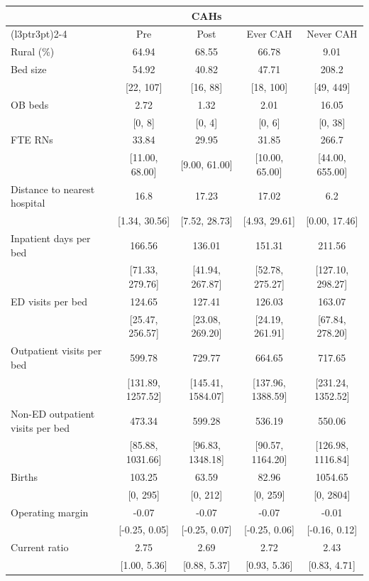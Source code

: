 \begin{tabular}[t]{lcccc}
\toprule
\multicolumn{1}{c}{ } & \multicolumn{3}{c}{CAHs} & \multicolumn{1}{c}{ } \\
\cmidrule(l{3pt}r{3pt}){2-4}
 & Pre & Post & Ever CAH & Never CAH\\
\midrule
Rural (\%) & 64.94 & 68.55 & 66.78 & 9.01 \\
Bed size & 54.92 & 40.82 & 47.71 & 208.2 \\
 & {}[22, 107] & {}[16, 88] & {}[18, 100] & {}[49, 449] \\
OB beds & 2.72 & 1.32 & 2.01 & 16.05 \\
 & {}[0, 8] & {}[0, 4] & {}[0, 6] & {}[0, 38] \\
FTE RNs & 33.84 & 29.95 & 31.85 & 266.7 \\
 & {}[11.00, 68.00] & {}[9.00, 61.00] & {}[10.00, 65.00] & {}[44.00, 655.00] \\
Distance to nearest hospital & 16.8 & 17.23 & 17.02 & 6.2 \\
 & {}[1.34, 30.56] & {}[7.52, 28.73] & {}[4.93, 29.61] & {}[0.00, 17.46] \\
Inpatient days per bed & 166.56 & 136.01 & 151.31 & 211.56 \\
 & {}[71.33, 279.76] & {}[41.94, 267.87] & {}[52.78, 275.27] & {}[127.10, 298.27] \\
ED visits per bed & 124.65 & 127.41 & 126.03 & 163.07 \\
 & {}[25.47, 256.57] & {}[23.08, 269.20] & {}[24.19, 261.91] & {}[67.84, 278.20] \\
Outpatient visits per bed & 599.78 & 729.77 & 664.65 & 717.65 \\
 & {}[131.89, 1257.52] & {}[145.41, 1584.07] & {}[137.96, 1388.59] & {}[231.24, 1352.52] \\
Non-ED outpatient visits per bed & 473.34 & 599.28 & 536.19 & 550.06 \\
 & {}[85.88, 1031.66] & {}[96.83, 1348.18] & {}[90.57, 1164.20] & {}[126.98, 1116.84] \\
Births & 103.25 & 63.59 & 82.96 & 1054.65 \\
 & {}[0, 295] & {}[0, 212] & {}[0, 259] & {}[0, 2804] \\
Operating margin & -0.07 & -0.07 & -0.07 & -0.01 \\
 & {}[-0.25, 0.05] & {}[-0.25, 0.07] & {}[-0.25, 0.06] & {}[-0.16, 0.12] \\
Current ratio & 2.75 & 2.69 & 2.72 & 2.43 \\
 & {}[1.00, 5.36] & {}[0.88, 5.37] & {}[0.93, 5.36] & {}[0.83, 4.71] \\

\end{tabular}
